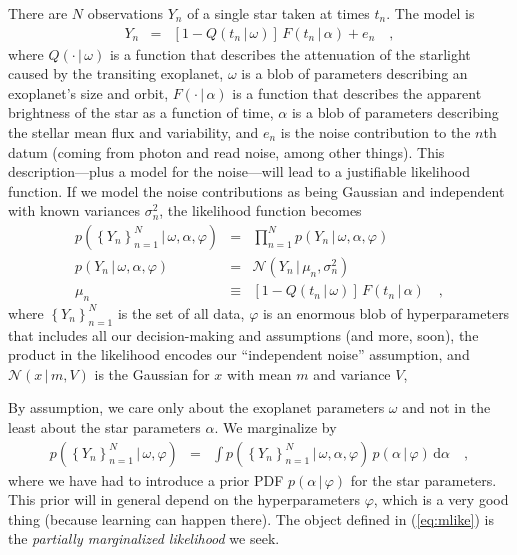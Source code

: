 \documentclass[12pt,letterpaper]{article}
\newcommand{\dd}{\mathrm{d}}
\newcommand{\given}{\,|\,}
\newcommand{\setof}[1]{\left\{{#1}\right\}}
\newcommand{\datum}{Y}
\newcommand{\data}{\setof{\datum_n}_{n=1}^N}
\renewcommand{\time}{t}
\newcommand{\exofn}{Q}
\newcommand{\exopars}{\omega}
\newcommand{\flux}{F}
\newcommand{\starpars}{\alpha}
\newcommand{\noise}{e}
\newcommand{\variance}{\sigma^2}
\newcommand{\hyperpars}{\varphi}
\newcommand{\normal}{{\mathcal N}}
\newcommand{\mean}{\mu}
\begin{document}
There are $N$ observations $\datum_n$ of a single star taken at times $\time_n$.
The model is
\begin{eqnarray}
\datum_n &=& [1 - \exofn(t_n\given\exopars)]\,\flux(t_n\given\starpars) + \noise_n
\quad ,
\end{eqnarray}
where
$\exofn(\cdot\given\exopars)$ is a function
that describes the attenuation of the starlight caused by the transiting exoplanet,
$\exopars$ is a blob of parameters describing an exoplanet's size and orbit,
$\flux(\cdot\given\starpars)$ is a function
that describes the apparent brightness of the star as a function of time,
$\starpars$ is a blob of parameters describing the stellar mean flux and variability,
and $\noise_n$ is the noise contribution to the $n$th datum
(coming from photon and read noise, among other things).
This description---plus a model for the noise---will lead to a justifiable likelihood function.
If we model the noise contributions as being Gaussian and independent
with known variances $\variance_n$, the likelihood function becomes
\begin{eqnarray}
p(\data\given\exopars,\starpars,\hyperpars)
  &=& \prod_{n=1}^N p(\datum_n\given\exopars,\starpars,\hyperpars)
\label{eq:like}
\\
p(\datum_n\given\exopars,\starpars,\hyperpars)
  &=& \normal(\datum_n\given\mean_n,\variance_n)
\\
\mean_n
  &\equiv& [1 - \exofn(t_n\given\exopars)]\,\flux(t_n\given\starpars)
\quad ,
\end{eqnarray}
where
$\data$ is the set of all data,
$\hyperpars$ is an enormous blob of hyperparameters
that includes all our decision-making and assumptions (and more, soon),
the product in the likelihood encodes our ``independent noise'' assumption,
and $\normal(x\given m,V)$ is the Gaussian for $x$ with mean $m$ and variance $V$,

By assumption, we care only about the exoplanet parameters $\exopars$
and not in the least about the star parameters $\starpars$.
We marginalize by
\begin{eqnarray}
p(\data\given\exopars,\hyperpars)
  &=& \int p(\data\given\exopars,\starpars,\hyperpars)\,p(\starpars\given\hyperpars)\,\dd\starpars
\label{eq:mlike}
\quad ,
\end{eqnarray}
where
we have had to introduce a prior PDF $p(\starpars\given\hyperpars)$ for the star parameters.
This prior will in general depend on the hyperparameters $\hyperpars$,
which is a very good thing (because learning can happen there).
The object defined in (\ref{eq:mlike}) is the \emph{partially marginalized likelihood}
we seek.
\end{document}
